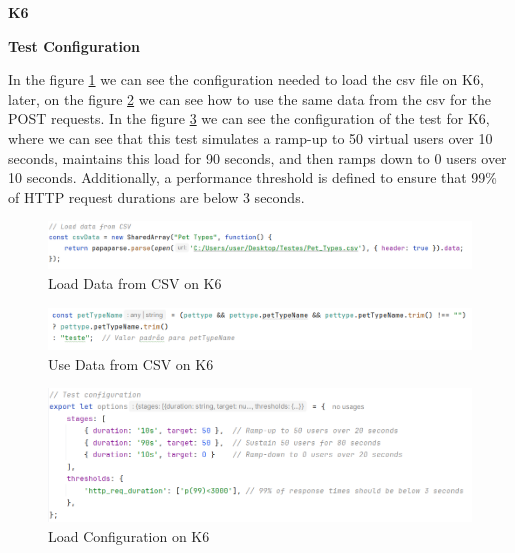 \documentclass[a4paper,11pt,openright,BCOR=15mm]{scrbook}
\begin{document}
\textbf{K6}




\textbf{Test Configuration}

In the figure \ref{fig:LoadCSVK6} we can see the configuration needed to load the csv file on K6, later, on the figure \ref{fig:LoadCSV2K6} we can see how to use the same data from the csv for the POST requests. In the figure \ref{fig:LoadConfigurationK6} we can see the configuration of the test for K6, where we can see that this test simulates a ramp-up to 50 virtual users over 10 seconds, maintains this load for 90 seconds, and then ramps down to 0 users over 10 seconds. Additionally, a performance threshold is defined to ensure that 99\% of HTTP request durations are below 3 seconds.


\begin{figure}[H]
	\centering
	\includegraphics[width=\textwidth]{figs/Performance/k6/loadcsv1.png}
	\caption{Load Data from CSV on K6}
	\label{fig:LoadCSVK6}
\end{figure}

\begin{figure}[H]
	\centering
	\includegraphics[width=\textwidth]{figs/Performance/k6/loadcsv2.png}
	\caption{Use Data from CSV on K6}
	\label{fig:LoadCSV2K6}
\end{figure}


\begin{figure}[H]
	\centering
	\includegraphics[width=\textwidth]{figs/Performance/k6/LoadPostK6.png}
	\caption{Load Configuration on K6}
	\label{fig:LoadConfigurationK6}
\end{figure}
\end{document}
